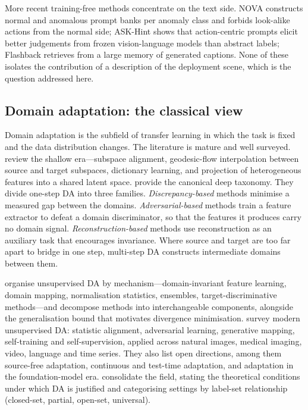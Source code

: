 \documentclass[a4paper,fleqn]{cas-sc}
\begin{document}
More recent training-free methods concentrate on the text side.
NOVA \citep{yin2026nova} constructs normal and anomalous prompt banks per anomaly
class and forbids look-alike actions from the normal side; ASK-Hint
\citep{zou2026askhint} shows that action-centric prompts elicit better judgements
from frozen vision-language models than abstract labels; Flashback
\citep{lee2025flashback} retrieves from a large memory of generated captions. None of
these isolates the contribution of a description of the deployment scene, which is
the question addressed here.

\subsection{Domain adaptation: the classical view}
Domain adaptation is the subfield of transfer learning in which the task is
fixed and the data distribution changes. The literature is mature and well
surveyed. \citet{patel2015visual} review the shallow era---subspace alignment,
geodesic-flow interpolation between source and target subspaces, dictionary
learning, and projection of heterogeneous features into a shared latent space.
\citet{wang2018deep} provide the canonical deep taxonomy. They divide one-step
DA into three families. \emph{Discrepancy-based} methods minimise a measured
gap between the domains. \emph{Adversarial-based} methods train a feature
extractor to defeat a domain discriminator, so that the features it produces
carry no domain signal. \emph{Reconstruction-based} methods use reconstruction
as an auxiliary task that encourages invariance. Where source and target are too
far apart to bridge in one step, multi-step DA constructs intermediate domains
between them.

\citet{wilson2020survey} organise unsupervised DA by mechanism---domain-invariant
feature learning, domain mapping, normalisation statistics, ensembles,
target-discriminative methods---and decompose methods into interchangeable
components, alongside the generalisation bound that motivates divergence
minimisation. \citet{liu2022deep} survey modern unsupervised DA:
statistic alignment, adversarial learning, generative mapping, self-training and
self-supervision, applied across natural images, medical imaging, video,
language and time series. They also list open directions, among them
source-free adaptation, continuous and test-time adaptation, and adaptation in
the foundation-model era. \citet{singhal2023domain} consolidate the field,
stating the theoretical conditions under which DA is justified and categorising
settings by label-set relationship (closed-set, partial, open-set, universal).
\end{document}
